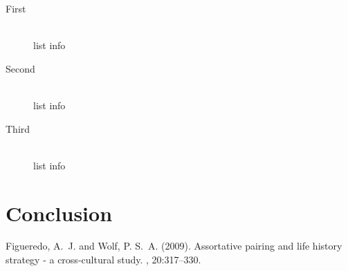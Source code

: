 \documentclass[12pt]{article} %
\begin{document}

\begin{description} %

\item[First] \hfill \\
list info

\item[Second] \hfill \\
list info

\item[Third] \hfill \\
list info

\end{description} 









\section{Conclusion} %



\begin{thebibliography}{99} %

Figueredo, A.~J. and Wolf, P. S.~A. (2009).
\newblock Assortative pairing and life history strategy - a cross-cultural
  study.
, 20:317--330.
 
\end{thebibliography}

\end{document}
